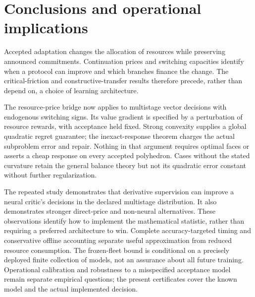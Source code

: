 \documentclass[11pt,letterpaper]{article}
\theoremstyle{definition}
\newcommand{\1}{\mathbf 1}
\begin{document}








\section{Conclusions and operational implications}
Accepted adaptation changes the allocation of resources while preserving announced commitments. Continuation prices and switching capacities identify when a protocol can improve and which branches finance the change. The critical-friction and constructive-transfer results therefore precede, rather than depend on, a choice of learning architecture.

The resource-price bridge now applies to multistage vector decisions with endogenous switching signs. Its value gradient is specified by a perturbation of resource rewards, with acceptance held fixed. Strong convexity supplies a global quadratic regret guarantee; the inexact-response theorem charges the actual subproblem error and repair. Nothing in that argument requires optimal faces or asserts a cheap response on every accepted polyhedron. Cases without the stated curvature retain the general balance theory but not its quadratic error constant without further regularization.

The repeated study demonstrates that derivative supervision can improve a neural critic's decisions in the declared multistage distribution. It also demonstrates stronger direct-price and non-neural alternatives. These observations identify how to implement the mathematical statistic, rather than requiring a preferred architecture to win. Complete accuracy-targeted timing and conservative offline accounting separate useful approximation from reduced resource consumption. The frozen-fleet bound is conditional on a precisely deployed finite collection of models, not an assurance about all future training. Operational calibration and robustness to a misspecified acceptance model remain separate empirical questions; the present certificates cover the known model and the actual implemented decision.
\end{document}

